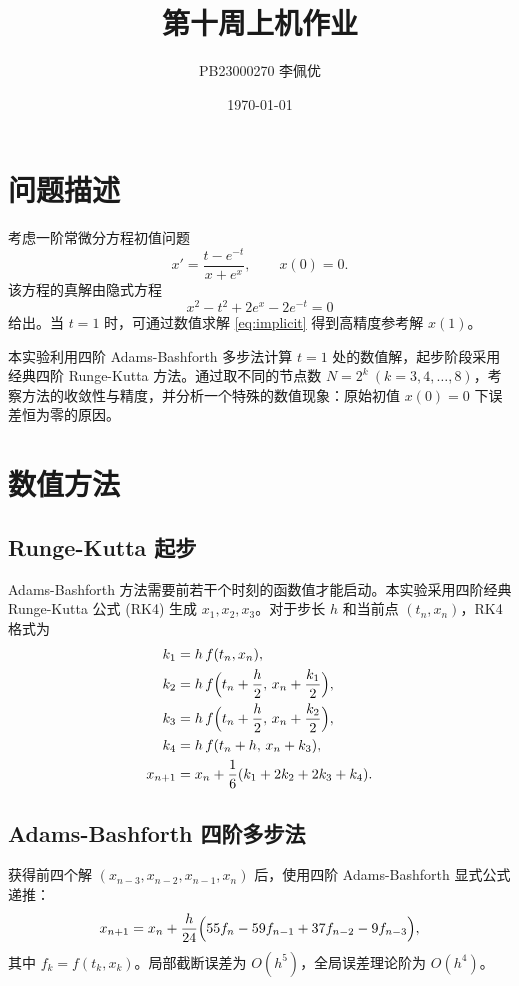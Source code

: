 \documentclass[12pt,a4paper]{article}
\title{第十周上机作业}
\author{PB23000270 李佩优}
\date{\today}
\begin{document}
\maketitle

\section{问题描述}

考虑一阶常微分方程初值问题
\begin{equation}\label{eq:ode}
    x' = \frac{t - e^{-t}}{x + e^x}, \qquad x(0) = 0.
\end{equation}
该方程的真解由隐式方程
\begin{equation}\label{eq:implicit}
    x^2 - t^2 + 2e^x - 2e^{-t} = 0
\end{equation}
给出。当 $t = 1$ 时，可通过数值求解 \eqref{eq:implicit} 得到高精度参考解 $x(1)$。

本实验利用四阶 Adams-Bashforth 多步法计算 $t=1$ 处的数值解，起步阶段采用经典四阶 Runge-Kutta 方法。通过取不同的节点数 $N = 2^k\ (k = 3,4,\dots,8)$，考察方法的收敛性与精度，并分析一个特殊的数值现象：原始初值 $x(0)=0$ 下误差恒为零的原因。

\section{数值方法}

\subsection{Runge-Kutta 起步}
Adams-Bashforth 方法需要前若干个时刻的函数值才能启动。本实验采用四阶经典 Runge-Kutta 公式 (RK4) 生成 $x_1, x_2, x_3$。对于步长 $h$ 和当前点 $(t_n, x_n)$，RK4 格式为
\[
\begin{aligned}
    k_1 &= h\,f(t_n, x_n), \\
    k_2 &= h\,f\Bigl(t_n + \frac{h}{2},\, x_n + \frac{k_1}{2}\Bigr), \\
    k_3 &= h\,f\Bigl(t_n + \frac{h}{2},\, x_n + \frac{k_2}{2}\Bigr), \\
    k_4 &= h\,f(t_n + h,\, x_n + k_3), \\
    x_{n+1} &= x_n + \frac{1}{6}(k_1 + 2k_2 + 2k_3 + k_4).
\end{aligned}
\]

\subsection{Adams-Bashforth 四阶多步法}
获得前四个解 $(x_{n-3}, x_{n-2}, x_{n-1}, x_n)$ 后，使用四阶 Adams-Bashforth 显式公式递推：
\begin{equation}\label{eq:ab4}
    x_{n+1} = x_n + \frac{h}{24}\Bigl(55 f_n - 59 f_{n-1} + 37 f_{n-2} - 9 f_{n-3}\Bigr),
\end{equation}
其中 $f_k = f(t_k, x_k)$。局部截断误差为 $O(h^5)$，全局误差理论阶为 $O(h^4)$。
\end{document}
